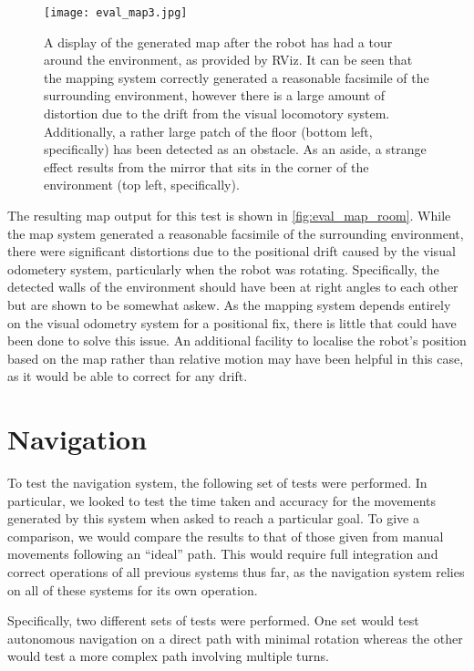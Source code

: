 \begin{figure}[h]
	\centering
	\texttt{[image: eval\_map3.jpg]}
	\caption{A display of the generated map after the robot has had a tour around the environment, as provided by RViz. It can be seen that the mapping system correctly generated a reasonable facsimile of the surrounding environment, however there is a large amount of distortion due to the drift from the visual locomotory system. Additionally, a rather large patch of the floor (bottom left, specifically) has been detected as an obstacle. As an aside, a strange effect results from the mirror that sits in the corner of the environment (top left, specifically).}
	\label{fig:eval_map_room}
\end{figure}

The resulting map output for this test is shown in \autoref{fig:eval_map_room}. While the map system generated a reasonable facsimile of the surrounding environment, there were significant distortions due to the positional drift caused by the visual odometery system, particularly when the robot was rotating. Specifically, the detected walls of the environment should have been at right angles to each other but are shown to be somewhat askew. As the mapping system depends entirely on the visual odometry system for a positional fix, there is little that could have been done to solve this issue. An additional facility to localise the robot's position based on the map rather than relative motion may have been helpful in this case, as it would be able to correct for any drift.

\section{Navigation}

To test the navigation system, the following set of tests were performed. In particular, we looked to test the time taken and accuracy for the movements generated by this system when asked to reach a particular goal. To give a comparison, we would compare the results to that of those given from manual movements following an ``ideal'' path. This would require full integration and correct operations of all previous systems thus far, as the navigation system relies on all of these systems for its own operation. 

Specifically, two different sets of tests were performed. One set would test autonomous navigation on a direct path with minimal rotation whereas the other would test a more complex path involving multiple turns.

